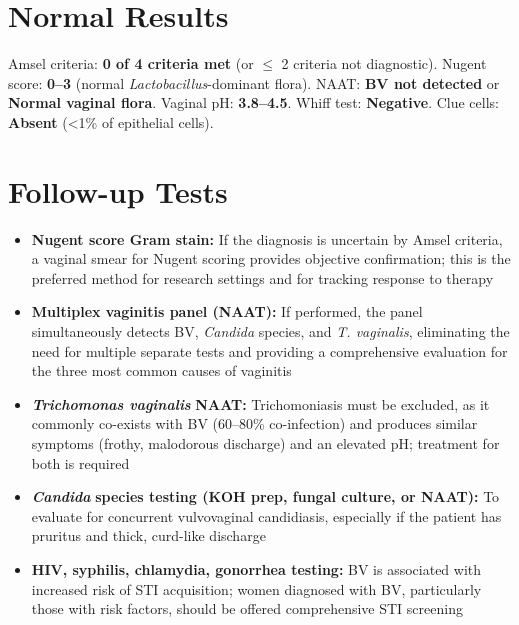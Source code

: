 \section*{Normal Results}
Amsel criteria: \textbf{0 of 4 criteria met} (or $\leq$ 2 criteria not diagnostic). Nugent score: \textbf{0--3} (normal \textit{Lactobacillus}-dominant flora). NAAT: \textbf{BV not detected} or \textbf{Normal vaginal flora}. Vaginal pH: \textbf{3.8--4.5}. Whiff test: \textbf{Negative}. Clue cells: \textbf{Absent} (<1\% of epithelial cells).

\section*{Follow-up Tests}
\begin{itemize}
  \item \textbf{Nugent score Gram stain:} If the diagnosis is uncertain by Amsel criteria, a vaginal smear for Nugent scoring provides objective confirmation; this is the preferred method for research settings and for tracking response to therapy
  \item \textbf{Multiplex vaginitis panel (NAAT):} If performed, the panel simultaneously detects BV, \textit{Candida} species, and \textit{T. vaginalis}, eliminating the need for multiple separate tests and providing a comprehensive evaluation for the three most common causes of vaginitis
  \item \textit{\textbf{Trichomonas vaginalis}} \textbf{NAAT:} Trichomoniasis must be excluded, as it commonly co-exists with BV (60--80\% co-infection) and produces similar symptoms (frothy, malodorous discharge) and an elevated pH; treatment for both is required
  \item \textit{\textbf{Candida}} \textbf{species testing (KOH prep, fungal culture, or NAAT):} To evaluate for concurrent vulvovaginal candidiasis, especially if the patient has pruritus and thick, curd-like discharge
  \item \textbf{HIV, syphilis, chlamydia, gonorrhea testing:} BV is associated with increased risk of STI acquisition; women diagnosed with BV, particularly those with risk factors, should be offered comprehensive STI screening
\end{itemize}

